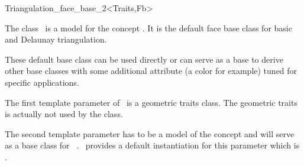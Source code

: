 

\begin{ccRefClass}{Triangulation_face_base_2<Traits,Fb>}  %

\ccDefinition
  
The class \ccRefName\ is a model for the concept
. It is the default face base class
for basic and Delaunay triangulation.

These default base class can be used directly or can serve as a base to derive
other base classes with some additional attribute (a color for example)
tuned for specific applications.


\ccParameters
The first template parameter of \ccRefName\ is  a geometric traits class.
The geometric traits is actually not used by the class.

The second template parameter 
has to be a  model of the concept 
and will serve as a base class for \ccRefName\ .
\cgal\ provides a default instantiation for this parameter which is
.



\ccIsModel
{}

\ccSeeAlso
{}\\
\\



\end{ccRefClass}


